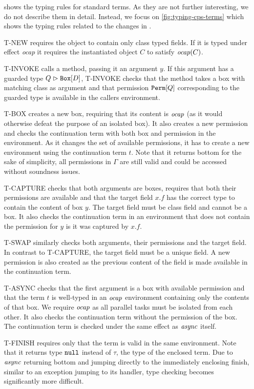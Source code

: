  shows the typing rules for standard terms. As they are not further interesting, we do not describe them in detail.
Instead, we focus on \cref{fig:typing-cps-terms} which shows the typing rules related to the changes in \plc.

T-NEW requires the object to contain only class typed fields. If it is typed under effect \textit{ocap} it requires the instantiated object $C$ to satisfy $\mathop{\mathit{ocap}}(C)$.

T-INVOKE calls a method, passing it an argument $y$. If this argument has a guarded type $Q \vartriangleright \texttt{Box}[D]$, T-INVOKE checks that the method takes a box with matching class as argument and that permission $\texttt{Perm}[Q]$ corresponding to the guarded type is available in the callers environment.

T-BOX creates a new box, requiring that its content is $\mathop{\mathit{ocap}}$ (as it would otherwise defeat the purpose of an isolated box). It also creates a new permission and checks the continuation term with both box and permission in the environment. As it changes the set of available permissions, it has to create a new environment using the continuation term $t$. Note that it returns bottom for the sake of simplicity, all permissions in $\Gamma$ are still valid and could be accessed without soundness issues.

T-CAPTURE checks that both arguments are boxes, requires that both their permissions are available and that the target field $x.f$ has the correct type to contain the content of box $y$. The target field must be class field and cannot be a box. It also checks the continuation term in an environment that does not contain the permission for $y$ is it was captured by $x.f$.

T-SWAP similarly checks both arguments, their permissions and the target field. In contrast to T-CAPTURE, the target field must be a unique field. A new permission is also created as the previous content of the field is made available in the continuation term.

T-ASYNC checks that the first argument is a box with available permission and that the term $t$ is well-typed in an $\mathop{\mathit{ocap}}$ environment containing only the contents of that box. We require $\mathop{\mathit{ocap}}$ as all parallel tasks must be isolated from each other. It also checks the continuation term without the permission of the box. The continuation term is checked under the same effect as $\mathop{\mathit{async}}$ itself.

T-FINISH requires only that the term is valid in the same environment. Note that it returns type $\texttt{null}$ instead of $\tau$, the type of the enclosed term. Due to $\mathop{\mathit{async}}$ returning bottom and jumping directly to the immediately enclosing finish, similar to an exception jumping to its handler, type checking becomes significantly more difficult.


